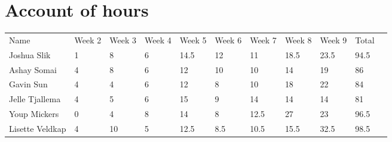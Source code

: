 \chapter{Account of hours}

\begin{table}[h]
\begin{tabular}{| l | l | l | l | l | l | l | l | l | l | l}
 Name & Week 2 & Week 3 & Week 4 & Week 5 & Week 6 & Week 7 & Week 8 & Week 9 & Total & \\
 Joshua Slik & 1 & 8 & 6 & 14.5 & 12 & 11 & 18.5 & 23.5 & 94.5 & \\
 Ashay Somai & 4 & 8 & 6 & 12 & 10 & 10 & 14 & 19 & 86 & \\
 Gavin Sun & 4 & 4 & 6 & 12 & 8 & 10 & 18 & 22 & 84 & \\
 Jelle Tjallema & 4 & 5 & 6 & 15 & 9 & 14 & 14 & 14 & 81 & \\
 Youp Mickers & 0 & 4 & 8 & 14 & 8 & 12.5 & 27 & 23 & 96.5 & \\
 Lisette Veldkap & 4 & 10 & 5 & 12.5 & 8.5 & 10.5 & 15.5 & 32.5 & 98.5 & \\
\end{tabular}
\end{table}